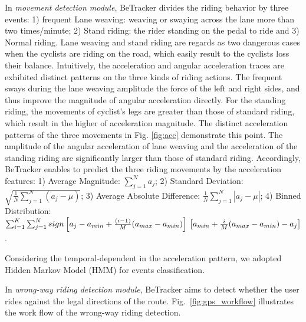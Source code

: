 \documentclass{sigchi-ext}
\def\sysname{BeTracker }
\begin{document}
In \textit{movement detection module}, \sysname divides the riding behavior by three events: 1) frequent Lane weaving: weaving or swaying across the lane more than two times/minute;  2) Stand riding: the rider standing on the pedal to ride and 3) Normal riding. 
Lane weaving and stand riding are regards as two dangerous cases when the cyclists are riding on the road, which easily result to the cyclists loss their balance.
Intuitively, the acceleration and angular acceleration traces are exhibited distinct patterns on the three kinds of riding actions. The frequent sways during the lane weaving amplitude the force of the left and right sides, and thus improve the magnitude of angular acceleration directly. For the standing riding, the movements of cyclist's legs are greater than those of standard riding, which result in the higher of acceleration magnitude.
The distinct acceleration patterns of the three movements in Fig. \ref{fig:acc} demonstrate this point. The amplitude of the angular acceleration of lane weaving and the acceleration of the standing riding  are significantly larger than those of standard riding.  Accordingly, \sysname enables to predict the three riding movements by the acceleration features:
1) Average Magnitude:  $\sum_{j=1}^{N}a_{j}$;
2) Standard Deviation:  $\sqrt{\frac{1}{N}\sum_{j=1}^{N}(a_{j}-\mu )}$;
3) Average Absolute Difference:  $\frac{1}{N}\sum_{j=1}^{N}\left |a_{j}-\mu   \right |$;
4) Binned Distribution: $\sum_{i=1}^{K}\sum_{j=1}^{N} sign\left [a_{j}-a_{min}+\frac{(i-1)}{M}(a_{max}-a_{min})\right ]\\\left [a_{min}+\frac{i}{M}(a_{max}-a_{min}) -a_j \right ]$.

Considering the temporal-dependent in the acceleration pattern, we adopted Hidden Markov Model (HMM) for events classification.


In \textit{wrong-way riding detection module}, \sysname aims to detect whether the user rides against the legal directions of the route.
Fig.~\ref{fig:gps_workflow} illustrates the work flow of the wrong-way riding detection. 
\end{document}
